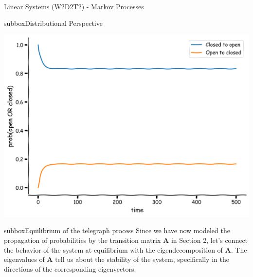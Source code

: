 \begin{textbox}{\href{https://colab.research.google.com/github/NeuromatchAcademy/course-content/blob/master/tutorials/W2D2_LinearSystems/student/W2D2_Tutorial2.ipynb}{Linear Systems (W2D2T2)} -  Markov Processes}
\begin{subbox}{subbox}{Distributional Perspective}
\begin{center}
\includegraphics[scale=0.1]{Figures/LS/MC_Figure5.png}
\end{center}

\end{subbox}
\begin{subbox}{subbox}{Equilibrium of the telegraph process}
\scriptsize
Since we have now modeled the propagation of probabilities by the transition matrix $\mathbf{A}$ in Section 2, let's connect the behavior of the system at equilibrium with the eigendecomposition of $\mathbf{A}$.
The eigenvalues of $\mathbf{A}$ tell us about the stability of the system, specifically in the directions of the corresponding eigenvectors.

\end{subbox}
\end{textbox}
